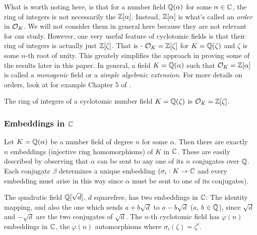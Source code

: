 What is worth noting here, is that for a number field $\mathbb{Q}(\alpha)$ for some $\alpha \in \mathbb{C}$, the ring of integers is not necessarily the $\mathbb{Z}[\alpha]$. Instead, $\mathbb{Z}[\alpha]$ is what's called an \textit{order} in $\mathcal{O}_K$. We will not consider them in general here because they are not relevant for our study. However, one very useful feature of cyclotomic fields is that their ring of integers is actually just $\mathbb{Z}[\zeta]$. That is - $\mathcal{O}_K = \mathbb{Z}[\zeta]$ for $K = \mathbb{Q}(\zeta)$ and $\zeta$ is some $n$-th root of unity. This greately simplifies the approach in proving some of the results later in this paper. In general, a field $K = \mathbb{Q}(\alpha)$ such that $\mathcal{O}_K = \mathbb{Z}[\alpha]$ is called a \textit{monogenic} field or a \textit{simple algebraic extension}. For more details on orders, look at for example Chapter 5 of \cite{stein}.

\begin{proposition}
	The ring of integers of a cyclotomic number field $K = \mathbb{Q}(\zeta)$ is $\mathcal{O}_K = \mathbb{Z}[\zeta]$.
\end{proposition}

\subsubsection*{Embeddings in $\mathbb{C}$}
Let $K = \mathbb{Q}(\alpha)$ be a number field of degree $n$ for some $\alpha$. Then there are exactly $n$ embeddings (injective ring homomorphisms) of $K$ in $\mathbb{C}$. These are easily described by observing that $\alpha$ can be sent to any one of its $n$ conjugates over $\mathbb{Q}$. Each conjugate $\beta$ determines a unique embedding $(\sigma_i: K \rightarrow \mathbb{C}$ and every embedding must arise in this way since $\alpha$ must be sent to one of its conjugates).

\begin{example}
    The quadratic field $\mathbb{Q}[\sqrt{d}]$, $d$ squarefree, has two embeddings in $\mathbb{C}$: The identity mapping, and also the one which sends $a + b\sqrt{d}$ to $a - b\sqrt{d}$ ($a$, $b$ $\in \mathbb{Q}$), since $\sqrt{d}$ and $-\sqrt{d}$ are the two conjugates of $\sqrt{d}$. The $n$-th cyclotomic field has $\varphi(n)$ embeddings in $\mathbb{C}$, the $\varphi(n)$ automorphisms where $\sigma_i(\zeta) = \zeta^i$.
\end{example}

\begin{definition}

\end{definition}


